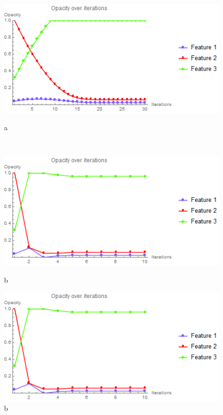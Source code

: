 \begin{figure}
	\centering
	\begin{minipage}{.3\textwidth}
		\includegraphics[width=1\linewidth]{images/opacity_fixed}
		\caption{a}	
	\end{minipage}~
	\begin{minipage}{.3\textwidth}
		\includegraphics[width=1\linewidth]{images/opacity_linesearch}
		\caption{b}	
	\end{minipage}
	\begin{minipage}{.3\textwidth}
		\includegraphics[width=1\linewidth]{images/opacity_parallelsearch}
		\caption{b}	
	\end{minipage}
	\label{fig:nucleon_opacity}
\end{figure}

